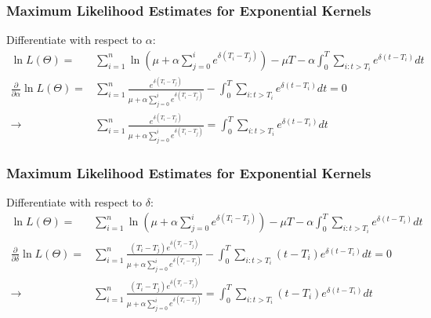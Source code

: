 \documentclass{beamer}
\begin{document}
\begin{frame}
\frametitle{Maximum Likelihood Estimates for Exponential Kernels}
Differentiate with respect to $\alpha$:
\begin{equation*}
\begin{split}
\ln L(\Theta) = & \sum_{i=1}^n \ln (\mu + \alpha \sum_{j=0}^i  e^{\delta (T_i - T_j)}) - \mu T - \alpha \int_{0}^{T}  \sum_{i: t>T_i} e^{\delta (t - T_i)} dt \\
\frac{\partial}{\partial \alpha} \ln L(\Theta) =& \sum_{i=1}^n \frac{e^{\delta (T_i - T_j)}}{\mu + \alpha \sum_{j=0}^i e^{\delta (T_i - T_j)}} - \int_{0}^{T}  \sum_{i: t>T_i} e^{\delta (t - T_i)} dt= 0\\
\to& \sum_{i=1}^n \frac{e^{\delta (T_i - T_j)}}{\mu + \alpha \sum_{j=0}^i e^{\delta (T_i - T_j)}} = \int_{0}^{T}  \sum_{i: t>T_i} e^{\delta (t - T_i)} dt
\end{split}
\end{equation*}
\end{frame}

\begin{frame}
\frametitle{Maximum Likelihood Estimates for Exponential Kernels}
Differentiate with respect to $\delta$:
\begin{equation*}
\begin{split}
\ln L(\Theta) = & \sum_{i=1}^n \ln (\mu + \alpha \sum_{j=0}^i  e^{\delta (T_i - T_j)}) - \mu T - \alpha \int_{0}^{T}  \sum_{i: t>T_i} e^{\delta (t - T_i)} dt \\
\frac{\partial}{\partial \delta} \ln L(\Theta) =& \sum_{i=1}^n \frac{(T_i - T_j)e^{\delta (T_i - T_j)}}{\mu + \alpha \sum_{j=0}^i e^{\delta (T_i - T_j)}} - \int_{0}^{T}  \sum_{i: t>T_i} (t - T_i)e^{\delta (t - T_i)} dt= 0\\
\to& \sum_{i=1}^n \frac{(T_i - T_j)e^{\delta (T_i - T_j)}}{\mu + \alpha \sum_{j=0}^i e^{\delta (T_i - T_j)}} = \int_{0}^{T}  \sum_{i: t>T_i} (t - T_i)e^{\delta (t - T_i)} dt
\end{split}
\end{equation*}
\end{frame}
\end{document}
